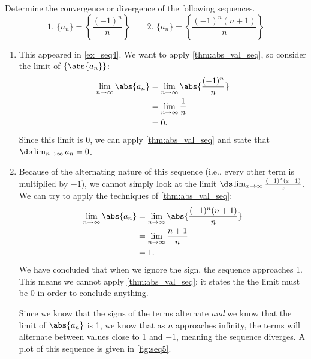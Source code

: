 \begin{example}\label{ex_seq5}%
Determine the convergence or divergence of the following sequences.
\[
 \text{1. }\{a_n\} = \left\{\frac{(-1)^n}{n}\right\}\qquad
 \text{2. }\{a_n\} = \left\{\frac{(-1)^n(n+1)}{n}\right\}
\]
\solution
\begin{enumerate}
\item		This appeared in \autoref{ex_seq4}. We want to apply \autoref{thm:abs_val_seq}, so consider the limit of $\{\abs{a_n}\}$:
\begin{align*}
\lim_{n\to\infty}\abs{a_n}&= \lim_{n\to\infty} \abs{\frac{(-1)^n}{n}} \\
					&= \lim_{n\to\infty} \frac1n \\
					&= 0.
\end{align*}
Since this limit is 0, we can apply \autoref{thm:abs_val_seq} and state that $\ds\lim_{n\to\infty} a_n=0$.

\item Because of the alternating nature of this sequence (i.e., every other term is multiplied by $-1$), we cannot simply look at the limit $\ds \lim_{x\to\infty} \frac{(-1)^x(x+1)}{x}$. We can try to apply the techniques of \autoref{thm:abs_val_seq}:
\begin{align*}
	\lim_{n\to\infty}\abs{a_n}
	&= \lim_{n\to\infty} \abs{\frac{(-1)^n(n+1)}{n}} \\
	&= \lim_{n\to\infty} \frac{n+1}{n}\\
	&= 1.
\end{align*}
%
%
%
We have concluded that when we ignore the sign, the sequence approaches 1. This means we cannot apply \autoref{thm:abs_val_seq}; it states the the limit must be 0 in order to conclude anything.

Since we know that the signs of the terms alternate \emph{and} we know that the limit of $\abs{a_n}$ is 1, we know that as $n$ approaches infinity, the terms will alternate between values close to 1 and $-1$, meaning the sequence diverges. A plot of this sequence is given in \autoref{fig:seq5}.
\end{enumerate}
\end{example}


